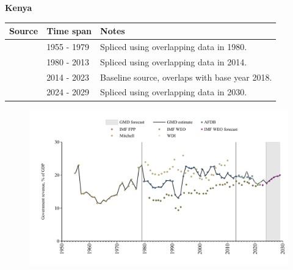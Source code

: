 \documentclass[12pt,a4paper,landscape]{article}
\begin{document}
\begin{adjustbox}{max totalsize={\paperwidth}{\paperheight},center}
\begin{minipage}[t][\textheight][t]{\textwidth}
\vspace*{0.5cm}
{}
\begin{center}
{\Large\bfseries Kenya}
\end{center}
\vspace{0.5cm}
\begin{table}[H]
\centering
\small
\begin{tabular}{|l|l|l|}
\hline
\textbf{Source} & \textbf{Time span} & \textbf{Notes} \\
\hline
\rowcolor{white}\cite{Mitchell}& 1955 - 1979 &Spliced using overlapping data in 1980.\\
\rowcolor{lightgray}\cite{AFDB}& 1980 - 2013 &Spliced using overlapping data in 2014.\\
\rowcolor{white}\cite{WDI}& 2014 - 2023 &Baseline source, overlaps with base year 2018.\\
\rowcolor{lightgray}\cite{IMF_WEO_forecast}& 2024 - 2029 &Spliced using overlapping data in 2030.\\
\hline
\end{tabular}
\end{table}
\begin{figure}[H]
\centering
\includegraphics[width=\textwidth,height=0.6\textheight,keepaspectratio]{graphs/KEN_govrev_GDP.pdf}
\end{figure}
\end{minipage}
\end{adjustbox}
\end{document}
